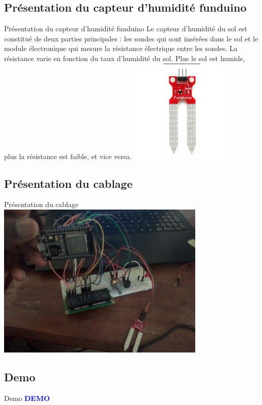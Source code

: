 \documentclass{beamer}
\newcommand\myfontsize{\fontsize{14pt}{18pt}\selectfont}
\begin{document}
	\subsection{Présentation du capteur d'humidité funduino}
	\begin{frame}{Présentation du capteur d'humidité funduino}
		Le capteur d'humidité du sol est constitué de deux parties principales : les sondes qui sont insérées dans le sol et le module électronique qui mesure la résistance électrique entre les sondes. La résistance varie en fonction du taux d'humidité du sol. Plus le sol est humide, plus la résistance est faible, et vice versa.
		\centering
    			\includegraphics[width=5cm]{hum.jpg}
	\end{frame}
	\subsection{Présentation du cablage}
	\begin{frame}{Présentation du cablage}
		\centering
    			\includegraphics[width=10cm]{cablage.jpg}
	\end{frame}
	\subsection{Demo}
	\begin{frame}{Demo}
		\centering
		{\myfontsize \textcolor{blue}{\textbf{DEMO}}}
	\end{frame}
\end{document}

